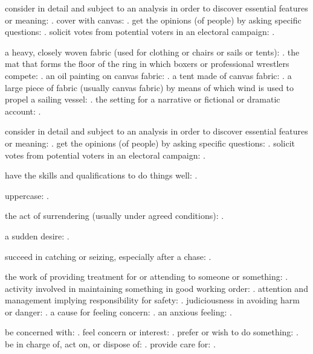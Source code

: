   consider in detail and subject to an analysis in order to discover essential features or meaning: . cover with canvas: . get the opinions (of people) by asking specific questions: . solicit votes from potential voters in an electoral campaign: .

  a heavy, closely woven fabric (used for clothing or chairs or sails or tents): . the mat that forms the floor of the ring in which boxers or professional wrestlers compete: . an oil painting on canvas fabric: . a tent made of canvas fabric: . a large piece of fabric (usually canvas fabric) by means of which wind is used to propel a sailing vessel: . the setting for a narrative or fictional or dramatic account: .

  consider in detail and subject to an analysis in order to discover essential features or meaning: . get the opinions (of people) by asking specific questions: . solicit votes from potential voters in an electoral campaign: .

  have the skills and qualifications to do things well: .

  uppercase: .

  the act of surrendering (usually under agreed conditions): .

  a sudden desire: .

  succeed in catching or seizing, especially after a chase: .

  the work of providing treatment for or attending to someone or something: . activity involved in maintaining something in good working order: . attention and management implying responsibility for safety: . judiciousness in avoiding harm or danger: . a cause for feeling concern: . an anxious feeling: .

  be concerned with: . feel concern or interest: . prefer or wish to do something: . be in charge of, act on, or dispose of: . provide care for: .


